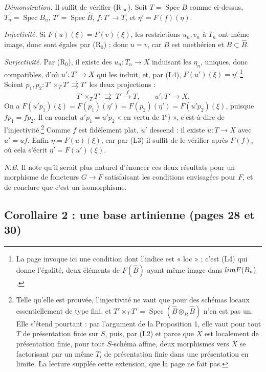 \documentclass[11pt,a4paper]{article}
\begin{document}
\emph{Démonstration.} Il suffit de vérifier (R$_{\mathrm{loc}}$). Soit $T =
\operatorname{Spec} B$ comme ci-dessus, $T_n = \operatorname{Spec} B_n$, $T' =
\operatorname{Spec} \widehat{B}$, $f : T' \to T$, et $\eta' = F(f)(\eta)$.

\emph{Injectivité.} Si $F(u)(\xi) = F(v)(\xi)$, les restrictions $u_n, v_n$ à
$T_n$ ont même image, donc sont égales par (R$_0$) ; donc $u = v$, car $B$
est noethérien et $B \subset \widehat{B}$.

\emph{Surjectivité.} Par (R$_0$), il existe des $u_n : T_n \to X$ induisant
les $\eta_n$, uniques, donc compatibles, d'où $u' : T' \to X$ qui les induit,
et, par (L4), $F(u')(\xi) = \eta'$.\footnote{La page invoque ici une condition
dont l'indice est « loc » ; c'est (L4) qui donne l'égalité, deux éléments de
$F(\widehat{B})$ ayant même image dans $\varprojlim F(B_n)$.} Soient $p_1, p_2
: T' \times_T T' \rightrightarrows T'$ les deux projections :
\[
T' \times_T T' \;\rightrightarrows\; T' \xrightarrow{\ f\ } T,
\qquad u' : T' \to X .
\]
On a $F(u' p_1)(\xi) = F(p_1)(\eta') = F(p_2)(\eta') = F(u' p_2)(\xi)$,
puisque $f p_1 = f p_2$. Il en conclut $u' p_1 = u' p_2$ « en vertu de
1°) », c'est-à-dire de l'injectivité.\footnote{Telle qu'elle est prouvée,
l'injectivité ne vaut que pour des schémas locaux essentiellement de type
fini, et $T' \times_T T' = \operatorname{Spec}(\widehat{B} \otimes_B
\widehat{B})$ n'en est pas un. Elle s'étend pourtant : par l'argument de la
Proposition 1, elle vaut pour tout $T$ de présentation finie sur $S$, puis,
par (L2) et parce que $X$ est localement de présentation finie, pour tout
$S$-schéma affine, deux morphismes vers $X$ se factorisant par un même
$T_i$ de présentation finie dans une présentation en limite. La lecture
supplée cette extension, que la page ne fait pas.} Comme $f$ est fidèlement
plat, $u'$ descend : il existe $u : T \to X$ avec $u' = u f$. Enfin
$\eta = F(u)(\xi)$, car par (L3) il suffit de le vérifier après $F(f)$, où
cela s'écrit $\eta' = F(u')(\xi)$.

\emph{N.B.} Il note qu'il serait plus naturel d'énoncer ces deux résultats
pour un morphisme de foncteurs $G \to F$ satisfaisant les conditions
envisagées pour $F$, et de conclure que c'est un isomorphisme.

\subsection*{Corollaire 2 : une base artinienne (pages 28 et 30)}
\end{document}
